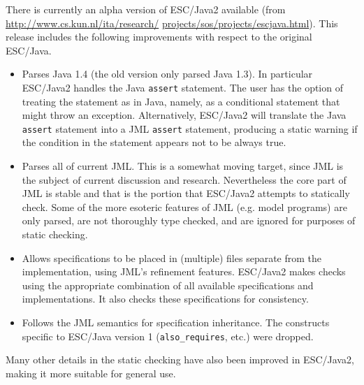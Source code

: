 There is currently an alpha version of ESC/Java2 available
(from \url{http://www.cs.kun.nl/ita/research/} 
\url{projects/sos/projects/escjava.html}).
This release includes the following improvements with respect to the original
ESC/\-Java.


\begin{itemize}
\item Parses Java 1.4 (the old version only parsed Java 1.3). 
  In particular ESC/Java2 handles the Java
  \verb$assert$ statement.  The user has the option of treating the
  statement as in Java, namely, as a conditional statement that
  might throw an exception.  Alternatively, ESC/Java2 will translate
  the Java \verb$assert$ statement into a JML \verb$assert$ statement,
  producing a static warning if the condition in the
  statement appears not to be always true.
\item Parses all of current JML.  This is a somewhat moving target,
  since JML is the subject of current discussion and research.
  Nevertheless the core part of JML is stable and that is the portion
  that ESC/Java2 attempts to statically check.  Some
  of the more esoteric features of JML (e.g. model programs)
  are only parsed, are not thoroughly type checked, and are ignored for
  purposes of static checking.
\item Allows specifications to be placed in (multiple) files separate from the
  implementation, using JML's refinement features.  ESC/Java2 makes checks
  using the appropriate combination of all available specifications and
  implementations.  It also checks these specifications for consistency.
\item Follows the JML semantics for specification inheritance.
  The constructs specific to ESC/Java version 1
  (\verb$also_requires$, etc.)
  were dropped.
\end{itemize}

Many other details in the static checking have also been improved in
ESC/Java2, making it more suitable for general use.

